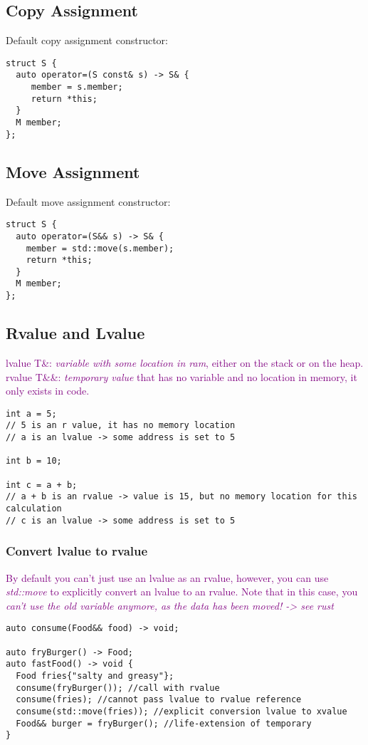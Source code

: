 \documentclass[main.tex,fontsize=8pt,paper=a4,paper=portrait,DIV=calc,]{scrartcl}
\begin{document}
\subsection{Copy Assignment}
Default copy assignment constructor:
\begin{lstlisting}
struct S {
  auto operator=(S const& s) -> S& {
     member = s.member;
     return *this;
  }
  M member;
};
\end{lstlisting}

\subsection{Move Assignment}
Default move assignment constructor:
\begin{lstlisting}
struct S {
  auto operator=(S&& s) -> S& {
    member = std::move(s.member);
    return *this;
  }
  M member;
};
\end{lstlisting}

\subsection{Rvalue and Lvalue}
\textcolor{purple}{lvalue T\&: \emph{variable with some location in ram}, either on the stack or on the heap.}\newline
\textcolor{purple}{rvalue T\&\&: \emph{temporary value} that has no variable and no location in memory, it only exists in code.}\newline
\begin{lstlisting}
int a = 5;
// 5 is an r value, it has no memory location
// a is an lvalue -> some address is set to 5

int b = 10;

int c = a + b;
// a + b is an rvalue -> value is 15, but no memory location for this calculation
// c is an lvalue -> some address is set to 5
\end{lstlisting}

\subsubsection{Convert lvalue to rvalue}
\textcolor{purple}{By default you can't just use an lvalue as an rvalue, however, you can use \emph{std::move} to explicitly convert an lvalue to an rvalue.\newline
Note that in this case, you \emph{can't use the old variable anymore, as the data has been moved! -> see rust}}
\begin{lstlisting}
auto consume(Food&& food) -> void;

auto fryBurger() -> Food;
auto fastFood() -> void {
  Food fries{"salty and greasy"};
  consume(fryBurger()); //call with rvalue
  consume(fries); //cannot pass lvalue to rvalue reference
  consume(std::move(fries)); //explicit conversion lvalue to xvalue
  Food&& burger = fryBurger(); //life-extension of temporary
}
\end{lstlisting}
\end{document}
